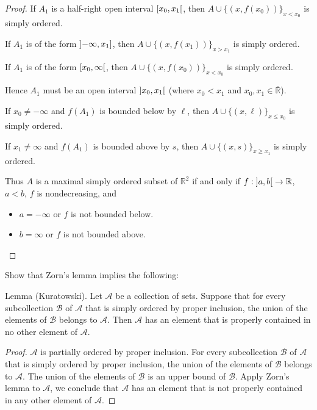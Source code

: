 \begin{proof}
    If $A_{1}$ is a half-right open interval $\left[{x_{0}, x_{1}}\right[$, then $A\cup {\{ (x, f(x_{0})) \}}_{x < x_{0}}$ is simply ordered.

    If $A_{1}$ is of the form $\left]{-\infty, x_{1}}\right]$, then $A\cup {\{ (x, f(x_{1})) \}}_{x > x_{1}}$ is simply ordered.

    If $A_{1}$ is of the form $\left[{x_{0}, \infty}\right[$, then $A\cup {\{ (x, f(x_{0})) \}}_{x < x_{0}}$ is simply ordered.

    Hence $A_{1}$ must be an open interval $\left]{x_{0}, x_{1}}\right[$ (where $x_{0} < x_{1}$ and $x_{0}, x_{1}\in\overline{\mathbb{R}}$).

    If $x_{0}\ne -\infty$ and $f(A_{1})$ is bounded below by $\ell$, then $A\cup {\{ (x, \ell) \}}_{x \leq x_{0}}$ is simply ordered.

    If $x_{1}\ne \infty$ and $f(A_{1})$ is bounded above by $s$, then $A\cup {\{ (x, s) \}}_{x\geq x_{1}}$ is simply ordered.

    Thus $A$ is a maximal simply ordered subset of $\mathbb{R}^{2}$ if and only if $f: \left]{a,b}\right[\to \mathbb{R}$, $a < b$, $f$ is nondecreasing, and
    \begin{itemize}[topsep=0pt,itemsep=0pt]
        \item $a = -\infty$ or $f$ is not bounded below.
        \item $b = \infty$ or $f$ is not bounded above.
    \end{itemize}
\end{proof}

\begin{exercise}\label{chapter1:section11:exercise5}
    Show that Zorn's lemma implies the following:

    Lemma (Kuratowski). Let $\mathscr{A}$ be a collection of sets. Suppose that for every subcollection $\mathscr{B}$ of $\mathscr{A}$ that is simply ordered by proper inclusion, the union of the elements of $\mathscr{B}$ belongs to $\mathscr{A}$. Then $\mathscr{A}$ has an element that is properly contained in no other element of $\mathscr{A}$.
\end{exercise}

\begin{proof}
    $\mathscr{A}$ is partially ordered by proper inclusion. For every  subcollection $\mathscr{B}$ of $\mathscr{A}$ that is simply ordered by proper inclusion, the union of the elements of $\mathscr{B}$ belongs to $\mathscr{A}$. The union of the elements of $\mathscr{B}$ is an upper bound of $\mathscr{B}$. Apply Zorn's lemma to $\mathscr{A}$, we conclude that $\mathscr{A}$ has an element that is not properly contained in any other element of $\mathscr{A}$.
\end{proof}

